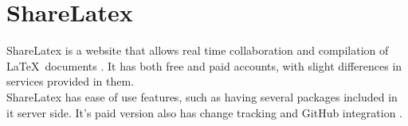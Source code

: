 \section{ShareLatex}
\newcommand{\latex}{\LaTeX\ }

ShareLatex is a website that allows real time collaboration and compilation
of \latex documents \cite{www-hid-sp18-601-slatex-documentation}. It has both 
free and paid accounts, with slight differences
 in services provided in them.\\
 
ShareLatex has ease of use features, such as having several packages included 
in it server side. It's paid version also has change tracking and GitHub
integration \cite{www-hid-sp18-601-slatex-plans}.